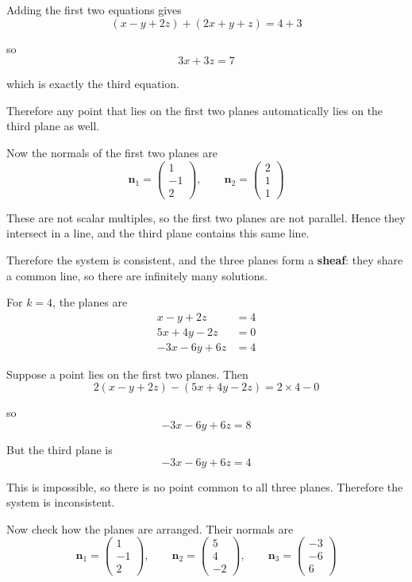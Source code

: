 \documentclass[leqno]{article}
\begin{document}
\begin{enumerate}[
  label=\textbf{\arabic*.},
  leftmargin=*,
  topsep=0pt,
  partopsep=0pt,
  parsep=0pt
]
\begin{djsSolution}
\begin{enumerate}[label=\textbf{(\alph*)}]
Adding the first two equations gives
\[
(x-y+2z)+(2x+y+z)=4+3
\]

so
\[
3x+3z=7
\]

which is exactly the third equation.

Therefore any point that lies on the first two planes automatically lies on the third plane as well.

Now the normals of the first two planes are
\[
\mathbf n_1=\begin{pmatrix}1\\-1\\2\end{pmatrix}, \qquad \mathbf n_2=\begin{pmatrix}2\\1\\1\end{pmatrix}
\]

These are not scalar multiples, so the first two planes are not parallel. Hence they intersect in a line, and the third plane contains this same line.

Therefore the system is consistent, and the three planes form a \textbf{sheaf}: they share a common line, so there are infinitely many solutions.

\medskip

For \(k=4\), the planes are
\[
\begin{aligned}
x-y+2z&=4\\
5x+4y-2z&=0\\
-3x-6y+6z&=4
\end{aligned}
\]

Suppose a point lies on the first two planes. Then
\[
2(x-y+2z)-(5x+4y-2z)=2\times 4-0
\]

so
\[
-3x-6y+6z=8
\]

But the third plane is
\[
-3x-6y+6z=4
\]

This is impossible, so there is no point common to all three planes. Therefore the system is inconsistent.

Now check how the planes are arranged. Their normals are
\[
\mathbf n_1=\begin{pmatrix}1\\-1\\2\end{pmatrix},\qquad
\mathbf n_2=\begin{pmatrix}5\\4\\-2\end{pmatrix},\qquad
\mathbf n_3=\begin{pmatrix}-3\\-6\\6\end{pmatrix}
\]


\end{enumerate}
\end{djsSolution}
\end{enumerate}
\end{document}
